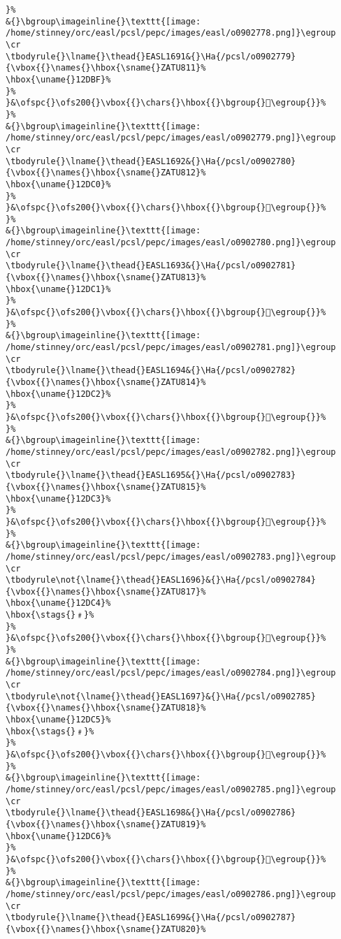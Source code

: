 \begin{verbatim}
}%
&{}\bgroup\imageinline{}\texttt{[image: /home/stinney/orc/easl/pcsl/pepc/images/easl/o0902778.png]}\egroup
\cr
\tbodyrule{}\lname{}\thead{}EASL1691&{}\Ha{/pcsl/o0902779}{\vbox{{}\names{}\hbox{\sname{}ZATU811}%
\hbox{\uname{}12DBF}%
}%
}&\ofspc{}\ofs200{}\vbox{{}\chars{}\hbox{{}\bgroup{}𒶿\egroup{}}%
}%
&{}\bgroup\imageinline{}\texttt{[image: /home/stinney/orc/easl/pcsl/pepc/images/easl/o0902779.png]}\egroup
\cr
\tbodyrule{}\lname{}\thead{}EASL1692&{}\Ha{/pcsl/o0902780}{\vbox{{}\names{}\hbox{\sname{}ZATU812}%
\hbox{\uname{}12DC0}%
}%
}&\ofspc{}\ofs200{}\vbox{{}\chars{}\hbox{{}\bgroup{}𒷀\egroup{}}%
}%
&{}\bgroup\imageinline{}\texttt{[image: /home/stinney/orc/easl/pcsl/pepc/images/easl/o0902780.png]}\egroup
\cr
\tbodyrule{}\lname{}\thead{}EASL1693&{}\Ha{/pcsl/o0902781}{\vbox{{}\names{}\hbox{\sname{}ZATU813}%
\hbox{\uname{}12DC1}%
}%
}&\ofspc{}\ofs200{}\vbox{{}\chars{}\hbox{{}\bgroup{}𒷁\egroup{}}%
}%
&{}\bgroup\imageinline{}\texttt{[image: /home/stinney/orc/easl/pcsl/pepc/images/easl/o0902781.png]}\egroup
\cr
\tbodyrule{}\lname{}\thead{}EASL1694&{}\Ha{/pcsl/o0902782}{\vbox{{}\names{}\hbox{\sname{}ZATU814}%
\hbox{\uname{}12DC2}%
}%
}&\ofspc{}\ofs200{}\vbox{{}\chars{}\hbox{{}\bgroup{}𒷂\egroup{}}%
}%
&{}\bgroup\imageinline{}\texttt{[image: /home/stinney/orc/easl/pcsl/pepc/images/easl/o0902782.png]}\egroup
\cr
\tbodyrule{}\lname{}\thead{}EASL1695&{}\Ha{/pcsl/o0902783}{\vbox{{}\names{}\hbox{\sname{}ZATU815}%
\hbox{\uname{}12DC3}%
}%
}&\ofspc{}\ofs200{}\vbox{{}\chars{}\hbox{{}\bgroup{}𒷃\egroup{}}%
}%
&{}\bgroup\imageinline{}\texttt{[image: /home/stinney/orc/easl/pcsl/pepc/images/easl/o0902783.png]}\egroup
\cr
\tbodyrule\not{\lname{}\thead{}EASL1696}&{}\Ha{/pcsl/o0902784}{\vbox{{}\names{}\hbox{\sname{}ZATU817}%
\hbox{\uname{}12DC4}%
\hbox{\stags{}﹟}%
}%
}&\ofspc{}\ofs200{}\vbox{{}\chars{}\hbox{{}\bgroup{}𒷄\egroup{}}%
}%
&{}\bgroup\imageinline{}\texttt{[image: /home/stinney/orc/easl/pcsl/pepc/images/easl/o0902784.png]}\egroup
\cr
\tbodyrule\not{\lname{}\thead{}EASL1697}&{}\Ha{/pcsl/o0902785}{\vbox{{}\names{}\hbox{\sname{}ZATU818}%
\hbox{\uname{}12DC5}%
\hbox{\stags{}﹟}%
}%
}&\ofspc{}\ofs200{}\vbox{{}\chars{}\hbox{{}\bgroup{}𒷅\egroup{}}%
}%
&{}\bgroup\imageinline{}\texttt{[image: /home/stinney/orc/easl/pcsl/pepc/images/easl/o0902785.png]}\egroup
\cr
\tbodyrule{}\lname{}\thead{}EASL1698&{}\Ha{/pcsl/o0902786}{\vbox{{}\names{}\hbox{\sname{}ZATU819}%
\hbox{\uname{}12DC6}%
}%
}&\ofspc{}\ofs200{}\vbox{{}\chars{}\hbox{{}\bgroup{}𒷆\egroup{}}%
}%
&{}\bgroup\imageinline{}\texttt{[image: /home/stinney/orc/easl/pcsl/pepc/images/easl/o0902786.png]}\egroup
\cr
\tbodyrule{}\lname{}\thead{}EASL1699&{}\Ha{/pcsl/o0902787}{\vbox{{}\names{}\hbox{\sname{}ZATU820}%

\end{verbatim}
